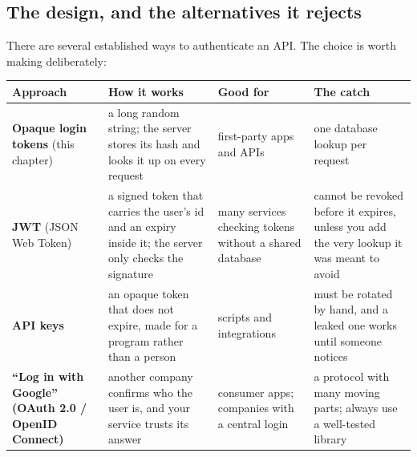 \subsection*{The design, and the alternatives it rejects}\label{38-security:the-design-and-the-alternatives-it-rejects}

There are several established ways to authenticate an API. The choice is worth making deliberately:


{\def\LTcaptype{none} %
\begin{longtable}[]{@{}
  >{\raggedright\arraybackslash}p{}
  >{\raggedright\arraybackslash}p{}
  >{\raggedright\arraybackslash}p{}
  >{\raggedright\arraybackslash}p{}@{}}
\toprule\noalign{}
\begin{minipage}[b]{\linewidth}\raggedright
Approach
\end{minipage} & \begin{minipage}[b]{\linewidth}\raggedright
How it works
\end{minipage} & \begin{minipage}[b]{\linewidth}\raggedright
Good for
\end{minipage} & \begin{minipage}[b]{\linewidth}\raggedright
The catch
\end{minipage} \\
\midrule\noalign{}
\endhead
\bottomrule\noalign{}
\endlastfoot
\textbf{Opaque login tokens} (this chapter) & a long random string; the server stores its hash and looks it up on every request & first-party apps and APIs & one database lookup per request \\
\textbf{JWT} (JSON Web Token) & a signed token that carries the user's id and an expiry inside it; the server only checks the signature & many services checking tokens without a shared database & cannot be revoked before it expires, unless you add the very lookup it was meant to avoid \\
\textbf{API keys} & an opaque token that does not expire, made for a program rather than a person & scripts and integrations & must be rotated by hand, and a leaked one works until someone notices \\
\textbf{``Log in with Google'' (OAuth 2.0 / OpenID Connect)} & another company confirms who the user is, and your service trusts its answer & consumer apps; companies with a central login & a protocol with many moving parts; always use a well-tested library \\
\end{longtable}
}

